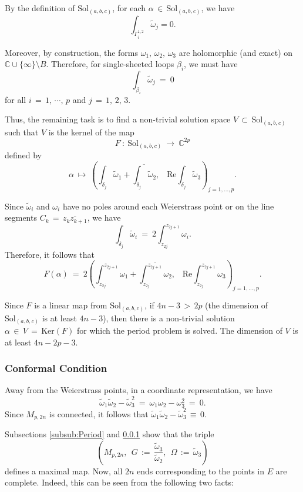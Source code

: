 \documentclass[12pt]{amsart}
\numberwithin{equation}{section}
\begin{document}
By the definition of $\text{Sol}_{(a,b,c)}$,  for each $\alpha\,\in\, \text{Sol}_{(a,b,c)}$, we have 
\[\int_{\Gamma_i^{1,2}}\widetilde{\omega}_j=0.\]

Moreover, by construction, the forms $\omega_1,\,\omega_2,\,\omega_3$ are holomorphic (and exact)  on
$\mathbb{C}\cup\{\infty\}\setminus B$. Therefore, for single-sheeted loops \(\beta_i\), we must have
$$\int_{\beta_i} \widetilde{\omega}_j \ =\ 0$$
for all \(i\,=\,1,\,\cdots,\,p\) and \(j\,=\,1,\,2,\,3\).

Thus, the remaining task is to find a non-trivial solution space \( V \,\subset\, \text{Sol}_{(a,b,c)} \) such 
that \( V \) is the kernel of the map
\[
F\ :\ \text{Sol}_{(a,b,c)} \ \longrightarrow\ \mathbb{C}^{2p}
\]
defined by
\[
\alpha\ \longmapsto\ \left(\int_{\delta_j}\widetilde{\omega}_1 + \overline{\int_{\delta_j}\widetilde{\omega}_2},\;\;\; \text{Re}\int_{\delta_j} \widetilde{\omega}_3\right)_{j=1,\ldots, p}.
\]

Since \(\widetilde{\omega}_i\) and \(\omega_i\) have no poles around each Weierstrass point or on the line
segments \(C_k 
\,=\, \overline{z_k z_{k+1}}\), we have
\[
\int_{\delta_j}\widetilde{\omega}_i\ =\ 2 \int_{z_{2j}}^{z_{2j+1}} \omega_i.
\]
Therefore, it follows that
\[
F(\alpha)\ =\ 2 \left(\int_{z_{2j}}^{z_{2j+1}} \omega_1 + \overline{\int_{z_{2j}}^{z_{2j+1}} \omega_2},
\;\;\; \text{Re} \int_{z_{2j}}^{z_{2j+1}} \omega_3 \right)_{j=1,\ldots, p}.
\]

Since \(F\) is a linear map from \(\text{Sol}_{(a,b,c)}\), if \(4n-3 \,>\, 2p\) (the dimension of 
\(\text{Sol}_{(a,b,c)}\) is at least \(4n-3\)), then there is a non-trivial solution \(\alpha \,\in\, V \,=\, 
\text{Ker}(F)\) for which the period problem is solved. The dimension of \(V\) is at least \(4n-2p-3\).

\subsubsection{Conformal Condition}\label{subsub:Conform}

Away from the Weierstrass points, in a coordinate representation, we have
\[
\widetilde{\omega}_1 \widetilde{\omega}_2 - \widetilde{\omega}_3^2\ =\ \omega_1 \omega_2 - \omega_3^2\ =\ 0.
\]
Since \(M_{p, 2n}\) is connected, it follows that \(\widetilde{\omega}_1 \widetilde{\omega}_2 - \widetilde{\omega}_3^2\, \equiv\, 0\).

Subsections \ref{subsub:Period} and \ref{subsub:Conform} show that the triple \[(M_{p, 2n},\, \; G \,:=\,
\frac{\widetilde{\omega}_3}{\widetilde{\omega}_2},\, \; \Omega \,:=\, \widetilde{\omega}_3)\] defines a maximal map. Now, all \(2n\) ends corresponding to the points in \(E\) are complete.
Indeed, this can be seen from the following two facts:
\end{document}
